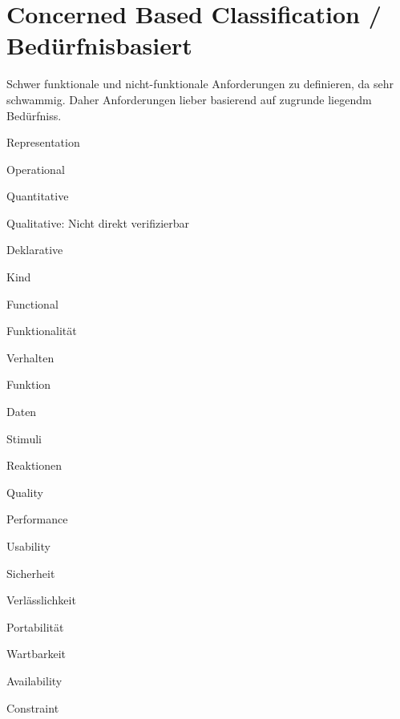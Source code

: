 \section{Concerned Based Classification / Bedürfnisbasiert}
Schwer funktionale und nicht-funktionale Anforderungen zu definieren, da sehr
schwammig. Daher Anforderungen lieber basierend auf zugrunde liegendm Bedürfniss.
\begin{compactitem}
    \item Representation
    \begin{compactitem}
        \item Operational
        \item Quantitative
        \item Qualitative: Nicht direkt verifizierbar
        \item Deklarative
    \end{compactitem}
    \item Kind

    \begin{compactitem}

        \item Functional
        \begin{compactitem}
            \item Funktionalität
            \item Verhalten
            \item Funktion
            \item Daten
            \item Stimuli
            \item Reaktionen
        \end{compactitem}
        \item Quality
        \begin{compactitem}
            \item Performance
            \item Usability
            \item Sicherheit
            \item Verlässlichkeit
            \item Portabilität
            \item Wartbarkeit
            \item Availability
        \end{compactitem}

        \item Constraint
    \end{compactitem}
\end{compactitem}


